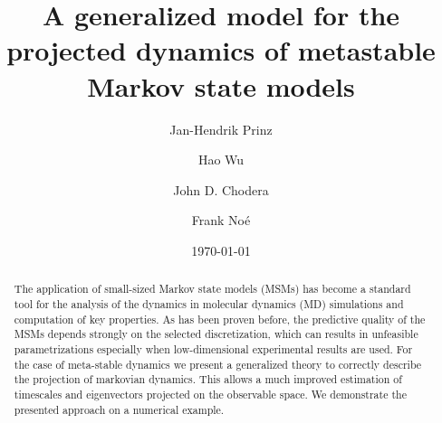 \documentclass[aps,pre,twocolumn,nofootinbib,superscriptaddress,linenumbers]{revtex4-1}
\begin{document}
\title{A generalized model for the projected dynamics of metastable Markov
state models}

\author{Jan-Hendrik Prinz}

\author{Hao Wu}

\author{John D. Chodera}

\author{Frank No\'{e}}

\date{\today}

\begin{abstract}

The application of small-sized Markov state models (MSMs) has become
a standard tool for the analysis of the dynamics in molecular dynamics
(MD) simulations and computation of key properties. As has been proven
before, the predictive quality of the MSMs depends strongly on the
selected discretization, which can results in unfeasible parametrizations
especially when low-dimensional experimental results are used. For
the case of meta-stable dynamics we present a generalized theory to
correctly describe the projection of markovian dynamics. This allows
a much improved estimation of timescales and eigenvectors projected
on the observable space. We demonstrate the presented approach on
a numerical example.

\end{abstract}


\maketitle
\end{document}
